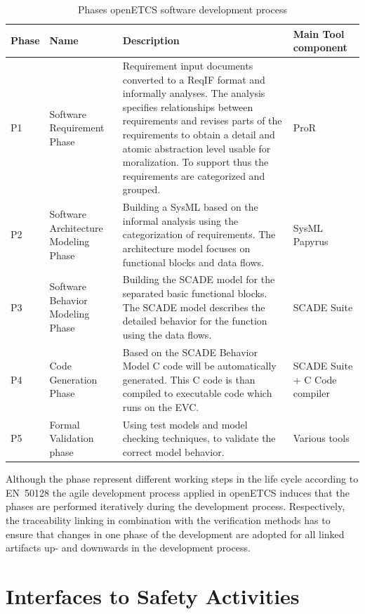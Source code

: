 \documentclass{template/openetcs_report}
\begin{document}
\begin{table}[htbp]
  \centering
  
  \caption{Phases openETCS software development process}
\begin{tabular}{|p{1cm}|p{2cm}|p{7.5cm}|p{2.5cm}|}
\hline \textbf{Phase} & \textbf{Name} & \textbf{Description} & \textbf{Main Tool component} \\ 
\hline P1 & Software Requirement Phase & Requirement input documents converted to a ReqIF format and informally analyses. The analysis specifies relationships between requirements and revises parts of the requirements to obtain a detail and atomic abstraction level usable for moralization. To support thus the requirements are categorized and grouped. & ProR \\ 
\hline P2 & Software Architecture Modeling Phase & Building a SysML based on the informal analysis using the categorization of requirements. The architecture model focuses on functional blocks and data flows. & SysML Papyrus \\ 
\hline P3 & Software Behavior Modeling Phase & Building the SCADE model for the separated basic functional blocks. The SCADE model describes the detailed behavior for the function using the data flows. & SCADE Suite \\ 
\hline P4 & Code Generation Phase & Based on the SCADE Behavior Model C code will be automatically generated. This C code is than compiled to executable code which runs on the EVC. & SCADE Suite + C Code compiler\\
\hline P5 & Formal Validation phase & Using test models and model checking techniques, to validate the correct model behavior.  & Various tools \\ 
\hline 
\end{tabular} 
\label{tab:DevelopmentPhases}
\end{table}

Although the phase represent different working steps in the life cycle according to EN~50128 the agile development process applied in openETCS induces that the phases are performed iteratively during the development process. Respectively, the traceability linking in combination with the verification methods has to ensure that changes in one phase of the development are adopted for all linked artifacts up- and downwards in the development process.

\section{Interfaces to Safety Activities}
\end{document}

